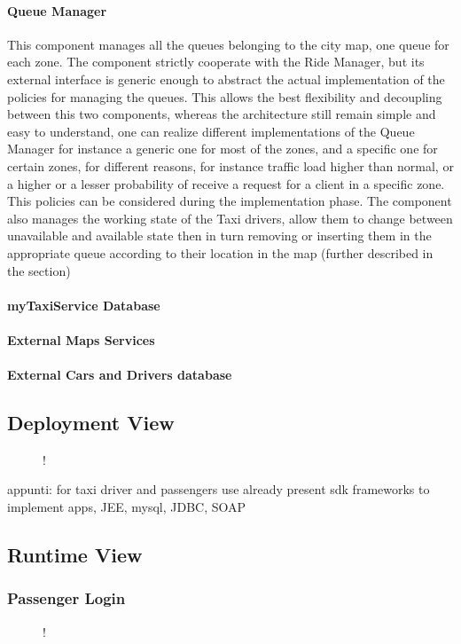 \paragraph{Queue Manager}
This component manages all the queues belonging to the city map, one queue for each zone. The component strictly cooperate with the Ride Manager, but its external interface is generic enough to abstract the actual implementation of the policies for managing the queues. This allows the best flexibility and decoupling between this two components, whereas the architecture still remain simple and easy to understand, one can realize different implementations of the Queue Manager for instance a generic one for most of the zones, and a specific one for certain zones, for different reasons, for instance traffic load higher than normal, or a higher or a lesser probability of receive a request for a client in a specific zone. This policies can be considered during the implementation phase. \newline
The component also manages the working state of the Taxi drivers, allow them to change between unavailable and available state then in turn removing or inserting them in the appropriate queue according to their location in the map (further described in the  section)
\paragraph{myTaxiService Database}
\paragraph{External Maps Services}
\paragraph{External Cars and Drivers database}
\subsection{Deployment View}
\begin{figure}[H]
	\centering
	\resizebox{6in}
	{!}{}
\end{figure}
appunti: for taxi driver and passengers use already present sdk frameworks to implement apps, JEE, mysql, JDBC, SOAP
\subsection{Runtime View}
\subsubsection{Passenger Login}
\begin{figure}[H]
	\small
	\centering
	\resizebox{6in}
	{!}{}
	\end{figure}

